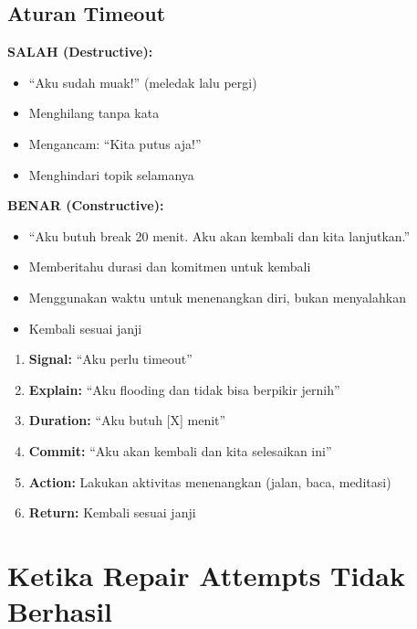 \subsection{Aturan Timeout}

\begin{warningbox}
\textbf{\textcolor{accent}{SALAH (Destructive):}}
\begin{itemize}
    \item ``Aku sudah muak!'' (meledak lalu pergi)
    \item Menghilang tanpa kata
    \item Mengancam: ``Kita putus aja!''
    \item Menghindari topik selamanya
\end{itemize}

\textbf{\textcolor{sagegreen}{BENAR (Constructive):}}
\begin{itemize}
    \item ``Aku butuh break 20 menit. Aku akan kembali dan kita lanjutkan.''
    \item Memberitahu durasi dan komitmen untuk kembali
    \item Menggunakan waktu untuk menenangkan diri, bukan menyalahkan
    \item Kembali sesuai janji
\end{itemize}
\end{warningbox}

\begin{praktikbox}
\begin{enumerate}
    \item \textbf{Signal:} ``Aku perlu timeout''
    \item \textbf{Explain:} ``Aku flooding dan tidak bisa berpikir jernih''
    \item \textbf{Duration:} ``Aku butuh [X] menit''
    \item \textbf{Commit:} ``Aku akan kembali dan kita selesaikan ini''
    \item \textbf{Action:} Lakukan aktivitas menenangkan (jalan, baca, meditasi)
    \item \textbf{Return:} Kembali sesuai janji
\end{enumerate}
\end{praktikbox}

\section{Ketika Repair Attempts Tidak Berhasil}

